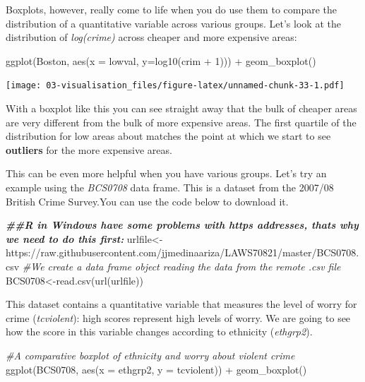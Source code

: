 \documentclass[
]{book}
\newenvironment{Shaded}{\begin{snugshade}}{\end{snugshade}}
\newcommand{\AttributeTok}[1]{\textcolor[rgb]{0.77,0.63,0.00}{#1}}
\newcommand{\CommentTok}[1]{\textcolor[rgb]{0.56,0.35,0.01}{\textit{#1}}}
\newcommand{\DecValTok}[1]{\textcolor[rgb]{0.00,0.00,0.81}{#1}}
\newcommand{\DocumentationTok}[1]{\textcolor[rgb]{0.56,0.35,0.01}{\textbf{\textit{#1}}}}
\newcommand{\FunctionTok}[1]{\textcolor[rgb]{0.00,0.00,0.00}{#1}}
\newcommand{\NormalTok}[1]{#1}
\newcommand{\OtherTok}[1]{\textcolor[rgb]{0.56,0.35,0.01}{#1}}
\newcommand{\SpecialCharTok}[1]{\textcolor[rgb]{0.00,0.00,0.00}{#1}}
\newcommand{\StringTok}[1]{\textcolor[rgb]{0.31,0.60,0.02}{#1}}
\begin{document}
Boxplots, however, really come to life when you do use them to compare the distribution of a quantitative variable across various groups. Let's look at the distribution of \emph{log(crime)} across cheaper and more expensive areas:

\begin{Shaded}
\begin{Highlighting}[]
\FunctionTok{ggplot}\NormalTok{(Boston, }\FunctionTok{aes}\NormalTok{(}\AttributeTok{x =}\NormalTok{ lowval, }\AttributeTok{y=}\FunctionTok{log10}\NormalTok{(crim }\SpecialCharTok{+} \DecValTok{1}\NormalTok{))) }\SpecialCharTok{+}
  \FunctionTok{geom\_boxplot}\NormalTok{()}
\end{Highlighting}
\end{Shaded}

\texttt{[image: 03-visualisation\_files/figure-latex/unnamed-chunk-33-1.pdf]}

With a boxplot like this you can see straight away that the bulk of cheaper areas are very different from the bulk of more expensive areas. The first quartile of the distribution for low areas about matches the point at which we start to see \textbf{outliers} for the more expensive areas.

This can be even more helpful when you have various groups. Let's try an example using the \emph{BCS0708} data frame. This is a dataset from the 2007/08 British Crime Survey.You can use the code below to download it.

\begin{Shaded}
\begin{Highlighting}[]
\DocumentationTok{\#\#R in Windows have some problems with https addresses, that\textquotesingle{}s why we need to do this first:}
\NormalTok{urlfile}\OtherTok{\textless{}{-}}\StringTok{\textquotesingle{}https://raw.githubusercontent.com/jjmedinaariza/LAWS70821/master/BCS0708.csv\textquotesingle{}}
\CommentTok{\#We create a data frame object reading the data from the remote .csv file}
\NormalTok{BCS0708}\OtherTok{\textless{}{-}}\FunctionTok{read.csv}\NormalTok{(}\FunctionTok{url}\NormalTok{(urlfile))}
\end{Highlighting}
\end{Shaded}

This dataset contains a quantitative variable that measures the level of worry for crime (\emph{tcviolent}): high scores represent high levels of worry. We are going to see how the score in this variable changes according to ethnicity (\emph{ethgrp2}).

\begin{Shaded}
\begin{Highlighting}[]
\CommentTok{\#A comparative boxplot of ethnicity and worry about violent crime}
\FunctionTok{ggplot}\NormalTok{(BCS0708, }\FunctionTok{aes}\NormalTok{(}\AttributeTok{x =}\NormalTok{ ethgrp2, }\AttributeTok{y =}\NormalTok{ tcviolent)) }\SpecialCharTok{+}
  \FunctionTok{geom\_boxplot}\NormalTok{()}
\end{Highlighting}
\end{Shaded}
\end{document}
